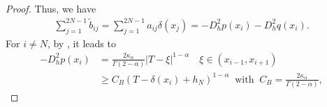 \documentclass{amsart}
\theoremstyle{definition}
\theoremstyle{remark}
\numberwithin{equation}{section}
\begin{document}
\begin{proof}
  Thus, we have
  \begin{equation*}
    \begin{aligned}
      \sum_{j=1}^{2N-1} \tilde{b}_{ij} =\sum_{j=1}^{2N-1} a_{ij} \delta(x_j)     
       =  - D_h^2  p (x_i) -  D_h^2 q(x_i) .
    \end{aligned}
  \end{equation*}
  For \(i \neq N\), by , it leads to
  \begin{equation*}
    \begin{aligned}
      -D_h^2 p(x_i) 
            & = \frac{2 \kappa_\alpha}{\Gamma(2-\alpha)} |T - \xi|^{1-\alpha}  \quad \xi \in (x_{i-1}, x_{i+1}) \\
            & \ge C_B (T - \delta(x_{i}) + h_N)^{1-\alpha} \;\; \text{with} \;\; C_B=\frac{2 \kappa_\alpha}{\Gamma(2-\alpha)},
    \end{aligned}
  \end{equation*}

\end{proof}
\end{document}
